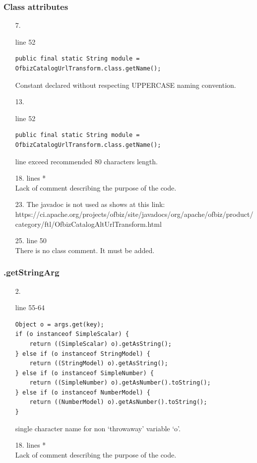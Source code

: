 \documentclass[english]{article}
\begin{document}
\subsubsection*{Class attributes }	
\begin{itemize}

\item[7.]{line 52
		\begin{lstlisting} 
public final static String module = OfbizCatalogUrlTransform.class.getName();
		\end{lstlisting}
		Constant declared without respecting UPPERCASE naming convention.}

\item[13.]{line 52
		\begin{lstlisting} 
public final static String module = OfbizCatalogUrlTransform.class.getName();
		\end{lstlisting}
		line exceed recommended 80 characters length.}
		
		\item[18.]{lines  *\\
		Lack of comment describing the purpose of the code.}
		
			\item[23.]{The javadoc is not used as shows at this link:\\
https://ci.apache.org/projects/ofbiz/site/javadocs/org/apache/ofbiz/product/category/ftl/OfbizCatalogAltUrlTransform.html}
	\item[25.]{line 50\\
There is no class comment. It must be added.
}
\end{itemize}
	
\subsubsection*{.getStringArg}
\begin{itemize}

\item[2.]{line 55-64
		\begin{lstlisting} 
Object o = args.get(key);
if (o instanceof SimpleScalar) {
    return ((SimpleScalar) o).getAsString();
} else if (o instanceof StringModel) {
    return ((StringModel) o).getAsString();
} else if (o instanceof SimpleNumber) {
    return ((SimpleNumber) o).getAsNumber().toString();
} else if (o instanceof NumberModel) {
    return ((NumberModel) o).getAsNumber().toString();
}
		\end{lstlisting}
		single character name for non `throwaway'  variable `o'.}


\item[18.]{lines  *\\
		Lack of comment describing the purpose of the code.}
\end{itemize}
\end{document}
